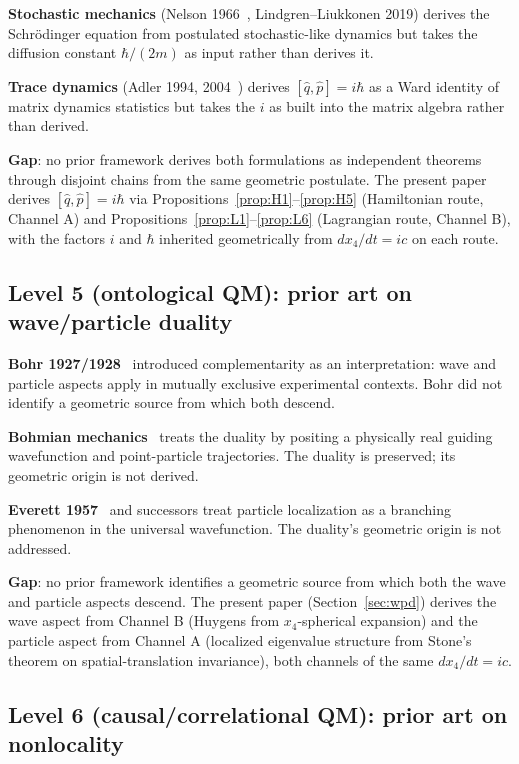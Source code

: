 \documentclass[11pt,a4paper]{article}
\begin{document}
\textbf{Stochastic mechanics} (Nelson 1966~\cite{nelson1966}, Lindgren--Liukkonen 2019) derives the Schr\"odinger equation from postulated stochastic-like dynamics but takes the diffusion constant $\hbar/(2m)$ as input rather than derives it.

\textbf{Trace dynamics} (Adler 1994, 2004~\cite{adler2004}) derives $[\hat{q}, \hat{p}] = i\hbar$ as a Ward identity of matrix dynamics statistics but takes the $i$ as built into the matrix algebra rather than derived.

\textbf{Gap}: no prior framework derives both formulations as independent theorems through disjoint chains from the same geometric postulate. The present paper derives $[\hat{q}, \hat{p}] = i\hbar$ via Propositions~\ref{prop:H1}--\ref{prop:H5} (Hamiltonian route, Channel A) and Propositions~\ref{prop:L1}--\ref{prop:L6} (Lagrangian route, Channel B), with the factors $i$ and $\hbar$ inherited geometrically from $dx_4/dt = ic$ on each route.

\subsection{Level 5 (ontological QM): prior art on wave/particle duality}

\textbf{Bohr 1927/1928}~\cite{bohr1928} introduced complementarity as an interpretation: wave and particle aspects apply in mutually exclusive experimental contexts. Bohr did not identify a geometric source from which both descend.

\textbf{Bohmian mechanics}~\cite{bohm1952} treats the duality by positing a physically real guiding wavefunction and point-particle trajectories. The duality is preserved; its geometric origin is not derived.

\textbf{Everett 1957}~\cite{everett1957} and successors treat particle localization as a branching phenomenon in the universal wavefunction. The duality's geometric origin is not addressed.

\textbf{Gap}: no prior framework identifies a geometric source from which both the wave and particle aspects descend. The present paper (Section~\ref{sec:wpd}) derives the wave aspect from Channel B (Huygens from $x_4$-spherical expansion) and the particle aspect from Channel A (localized eigenvalue structure from Stone's theorem on spatial-translation invariance), both channels of the same $dx_4/dt = ic$.

\subsection{Level 6 (causal/correlational QM): prior art on nonlocality}
\end{document}
